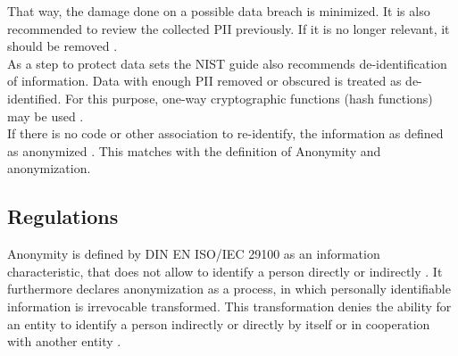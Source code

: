         That way, the damage done on a possible data breach is minimized. It is also recommended to review the collected PII previously. If it is no longer relevant, it should be removed \cite{mccallister_guide_2010}.\\
        As a step to protect data sets the NIST guide also recommends de-identification of information. Data with enough PII removed or obscured is treated as de-identified. For this purpose, one-way cryptographic functions (hash functions) may be used \cite{mccallister_guide_2010}.\\
        If there is no code or other association to re-identify, the information as defined as anonymized \cite{mccallister_guide_2010}. This matches with the definition of Anonymity and anonymization.


    \newpage
    \subsection{Regulations}
        \label{subsec:related:law}
        Anonymity is defined by DIN EN ISO/IEC 29100 as an information characteristic, that does not allow to identify a person directly or indirectly \cite{german_institute_for_standardization_din_2020}. It furthermore declares anonymization as a process, in which personally identifiable information is irrevocable transformed. This transformation denies the ability for an entity to identify a person indirectly or directly by itself or in cooperation with another entity \cite{german_institute_for_standardization_din_2020}.\\
        
